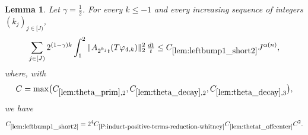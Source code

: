 \documentclass[12pt,reqno]{amsart}
\theoremstyle{plain}
\newtheorem{lemma}[theorem]{Lemma}
\numberwithin{equation}{section}
\theoremstyle{remark}
\newcommand{\uses}[1]{}
\newcommand{\usesdefs}[1]{}
\begin{document}
\begin{lemma}\label{lem:leftbump1_short2}\uses{A to Lambda,lem:theta_prim,lem:theta_decay,lem:thetat_offcenter,P:induct-positive-terms-reduction-whitney,lem:int_fct,lem:phi4_supp,lem:ft_deriv_mul}\usesdefs{A_def,bracket bump,normalized function tuples,auto:prism-form-definition,defn:window based bump functions}
Let $\gamma=\frac12$. For every $k\le-1$ and every increasing sequence of integers $(k_j)_{j\in[J)}$,
\begin{equation}\label{auto:left-bump-one-short-two-bound}
\sum_{j\in[J)}2^{(1-\gamma)k}\int_1^2
\|A_{2^{k_j}t}(T\varphi_{4,k})\|_2^2\,\tfrac{dt}{t}
\le C_{\ref{lem:leftbump1_short2}}J^{\alpha(n)},
\end{equation}
where, with
\begin{equation}\label{auto:left-bump-one-short-two-auxiliary-constant}
C=\max\bigl(C_{\ref{lem:theta_prim},2},C_{\ref{lem:theta_decay},2},C_{\ref{lem:theta_decay},3}\bigr),
\end{equation}
we have
\begin{equation}\label{auto:left-bump-one-short-two-constant-definition}
C_{\ref{lem:leftbump1_short2}}
=2^4C_{\ref{P:induct-positive-terms-reduction-whitney}}
C_{\ref{lem:thetat_offcenter}}C^2.
\end{equation}
\end{lemma}
\end{document}
